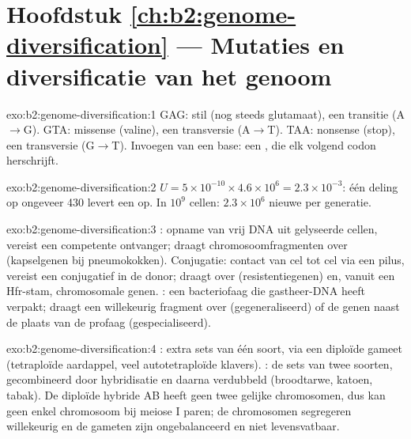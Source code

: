 \section*{Hoofdstuk \ref{ch:b2:genome-diversification} --- Mutaties en diversificatie van het genoom}

\begin{solution}{exo:b2:genome-diversification:1}
GAG: stil (nog steeds glutamaat), een transitie (A$\to$G). GTA: missense
(valine), een transversie (A$\to$T). TAA: nonsense (stop), een
transversie (G$\to$T). Invoegen van een base: een ,
die elk volgend codon herschrijft.
\end{solution}

\begin{solution}{exo:b2:genome-diversification:2}
$U = 5\times 10^{-10}\times 4.6\times 10^{6} = 2.3\times 10^{-3}$: één
deling op ongeveer 430 levert een  op. In $10^{9}$ cellen:
$2.3\times 10^{6}$ nieuwe  per generatie.
\end{solution}

\begin{solution}{exo:b2:genome-diversification:3}
: opname van vrij DNA uit gelyseerde cellen, vereist een
competente ontvanger; draagt chromosoomfragmenten over (kapselgenen bij
pneumokokken). Conjugatie: contact van cel tot cel via een pilus, vereist
een conjugatief  in de donor; draagt  over
(resistentiegenen) en, vanuit een Hfr-stam, chromosomale genen.
: een bacteriofaag die gastheer-DNA heeft verpakt; draagt een
willekeurig fragment over (gegeneraliseerd) of de genen naast de plaats
van de profaag (gespecialiseerd).
\end{solution}

\begin{solution}{exo:b2:genome-diversification:4}
: extra sets van één soort, via een diploïde gameet
(tetraploïde aardappel, veel autotetraploïde klavers). : de
sets van twee soorten, gecombineerd door hybridisatie en daarna
verdubbeld (broodtarwe, katoen, tabak). De diploïde hybride AB heeft geen
twee gelijke chromosomen, dus kan geen enkel chromosoom bij meiose I
paren; de chromosomen segregeren willekeurig en de gameten zijn
ongebalanceerd en niet levensvatbaar.
\end{solution}

